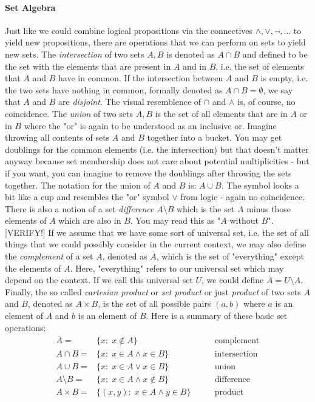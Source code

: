 \paragraph{Set Algebra} Just like we could combine logical propositions via the connectives $\wedge, \vee, \neg, \ldots$ to yield new propositions, there are operations that we can perform on sets to yield new sets. The \emph{intersection} of two sets $A, B$ is denoted as $A \cap B$ and defined to be the set with the elements that are present in $A$ and in $B$, i.e. the set of elements that $A$ and $B$ have in common. If the intersection between $A$ and $B$ is empty, i.e. the two sets have nothing in common, formally denoted as $A \cap B = \emptyset$, we say that $A$ and $B$ are \emph{disjoint}. The visual resemblence of $\cap$ and $\wedge$ is, of course, no coincidence. The \emph{union} of two sets $A,B$ is the set of all elements that are in $A$ or in $B$ where the "or" is again to be understood as an inclusive or. Imagine throwing all contents of sets $A$ and $B$ together into a bucket. You may get doublings for the common elements (i.e. the intersection) but that doesn't matter anyway because set membership does not care about potential multiplicities - but if you want, you can imagine to remove the doublings after throwing the sets together. The notation for the union of $A$ and $B$ is: $A \cup B$. The symbol looks a bit like a cup and resembles the "or" symbol $\vee$ from logic - again no coincidence. There is also a notion of a set \emph{difference} $A \setminus B$ which is the set $A$ minus those elements of $A$ which are also in $B$. You may read this as "$A$ without $B$". [VERIFY!] If we assume that we have some sort of universal set, i.e. the set of all things that we could possibly consider in the current context, we may also define the \emph{complement} of a set $A$, denoted as $\overline{A}$, which is the set of "everything" except the elements of $A$. Here, "everything" refers to our universal set which may depend on the context. If we call this universal set $U$, we could define $\overline{A} = U \setminus A$. Finally, the so called \emph{cartesian product} or \emph{set product} or just \emph{product} of two sets $A$ and $B$, denoted as $A \times B$, is the set of all possible pairs $(a,b)$ where $a$ is an element of $A$ and $b$ is an element of $B$. Here is a summary of these basic set operations:
\begin{eqnarray}
 \overline{A}  =& \{x: \; x \notin A \}                    \qquad &\text{complement} \\	
 A \cap B      =& \{x: \; x \in A \wedge x \in    B \}     \qquad &\text{intersection} \\
 A \cup B      =& \{x: \; x \in A \vee   x \in    B \}     \qquad &\text{union} \\
 A \setminus B =& \{x: \; x \in A \wedge x \notin B \}     \qquad &\text{difference} \\
 A \times B    =& \{(x,y): \; x \in A \wedge y \in    B \} \qquad &\text{product}
\end{eqnarray}
